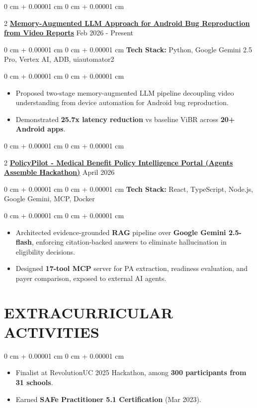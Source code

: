 \documentclass[9pt, letterpaper]{article}
\newenvironment{highlights}{
    \begin{itemize}[
        topsep=0.05 cm,
        parsep=0 pt,
        partopsep=0pt,
        itemsep=0pt,
        leftmargin=10pt
    ]
}{
    \end{itemize}
} %
\newenvironment{onecolentry}{
    \begin{adjustwidth}{
        0 cm + 0.00001 cm}{
        0 cm + 0.00001 cm}
}{
    \end{adjustwidth}
} %
\newenvironment{twocolentry}[2][]{
    \onecolentry
    \def\secondColumn{#2}
    \setcolumnwidth{\fill, 4.5 cm}
    \begin{paracol}{2}
}{
    \switchcolumn \raggedleft \secondColumn
    \end{paracol}
    \endonecolentry
} %
\begin{document}
    \begin{twocolentry}
        {Feb 2026 - Present}\href{https://github.com/Tanmayb05/gifdroid-reproduction}{\textbf{Memory-Augmented LLM Approach for Android Bug Reproduction from Video Reports}}    \end{twocolentry}
    \begin{onecolentry}\textbf{Tech Stack:} Python, Google Gemini 2.5 Pro, Vertex AI, ADB, uiautomator2 \end{onecolentry}
    \begin{onecolentry}
        \begin{highlights}
            \item Proposed two-stage memory-augmented LLM pipeline decoupling video understanding from device automation for Android bug reproduction.
            \item Demonstrated \textbf{25.7x latency reduction} vs baseline ViBR across \textbf{20+ Android apps}.
        \end{highlights}
    \end{onecolentry}
    \vspace{0.04 cm}

    \begin{twocolentry}
        {April 2026}\href{https://github.com/Tanmayb05/Policy-Intelligence-Lab}{\textbf{PolicyPilot - Medical Benefit Policy Intelligence Portal (Agents Assemble Hackathon)}}    \end{twocolentry}
    \begin{onecolentry}\textbf{Tech Stack:} React, TypeScript, Node.js, Google Gemini, MCP, Docker \end{onecolentry}
    \begin{onecolentry}
        \begin{highlights}
            \item Architected evidence-grounded \textbf{RAG} pipeline over \textbf{Google Gemini 2.5-flash}, enforcing citation-backed answers to eliminate hallucination in eligibility decisions.
            \item Designed \textbf{17-tool MCP} server for PA extraction, readiness evaluation, and payer comparison, exposed to external AI agents.
        \end{highlights}
    \end{onecolentry}
\section{EXTRACURRICULAR ACTIVITIES}

    \begin{onecolentry}
        \begin{highlights}
            \item Finalist at RevolutionUC 2025 Hackathon, among \textbf{300 participants from 31 schools}.
            \item Earned \textbf{SAFe Practitioner 5.1 Certification} (Mar 2023).
        \end{highlights}
    \end{onecolentry}
\end{document}
